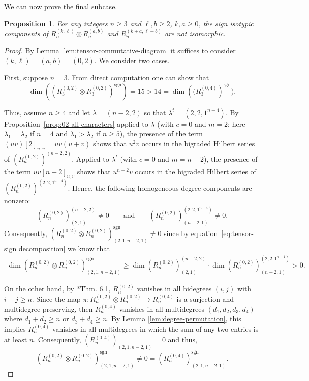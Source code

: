 \documentclass[11pt, reqno]{amsart}
\newtheorem{proposition}[theorem]{Proposition}
\theoremstyle{definition}
\theoremstyle{remark}
\numberwithin{equation}{section}
\newcommand{\0}{\emptyset}
\DeclareMathOperator{\sgn}{sgn}
\begin{document}
We can now prove the final subcase.

\begin{proposition}\label{prop:(0,2)x(0,2)}
    For any integers $n\geq 3$ and $\ell, b\geq 2$, $k,a\geq 0$, the sign isotypic components of $R_n^{(k,\ell)} \otimes R_n^{(a,b)}$ and $R_n^{(k+a, \ell+b)}$ are not isomorphic. 
\end{proposition}

\begin{proof}
By Lemma \ref{lem:tensor-commutative-diagram} it suffices to consider $(k,\ell)=(a,b)=(0,2)$. We consider two cases. 

First, suppose $n=3$. From direct computation one can show that 
\[\dim\left(\left(R_3^{(0,2)} \otimes R_3^{(0,2)}\right)^{\sgn}\right) = 15 > 14 = \dim\left((R_3^{(0,4)}\right)^{\sgn}).\]

Thus, assume $n \geq 4$ and let $\lambda = (n-2,2)$ so that $\lambda^t =(2,2,1^{n-4})$. 
By Proposition~\ref{prop:02-all-characters} 
applied to $\lambda$ (with $c = 0$ and $m = 2$; here $\lambda_1 = \lambda_2$ if $n = 4$ and $\lambda_1 > \lambda_2$ if $n \geq 5$), the presence of the term $(uv)[2]_{u,v} = uv(u+v)$ shows that $u^2v$ occurs in the bigraded Hilbert series of $(R_n^{(0,2)})^{(n-2,2)}$. 
Applied to $\lambda^t$ (with $c = 0$ and $m = n-2$), the presence of the term $uv[n-2]_{u,v}$ shows that $u^{n-2}v$ occurs in the bigraded Hilbert series of $(R_n^{(0,2)})^{(2,2,1^{n-4})}$.
Hence, the following homogeneous degree components are nonzero:
\[
\left(R_n^{(0,2)}\right)^{(n-2,2)}_{(2,1)} \neq 0 \qquad \text{and} \qquad \left(R_n^{(0,2)}\right)^{(2,2,1^{n-4})}_{(n-2,1)} \neq 0.
\]
Consequently, $\left(R_n^{(0,2)} \otimes R_n^{(0,2)}\right)^{\sgn}_{(2,1,n-2,1)} \neq 0$ since by equation~\eqref{eq:tensor-sign decomposition} we know that
\begin{align*}
        \dim \left(R_n^{(0,2)} \otimes R_n^{(0,2)}\right)^{\sgn}_{(2,1,n-2,1)} 
        \geq \dim \left(R_n^{(0,2)}\right)^{(n-2,2)}_{(2,1)} \cdot \dim \left(R_n^{(0,2)}\right)^{(2,2,1^{n-4})}_{(n-2,1)} >0.
\end{align*}

On the other hand, by \cite{KimRhoades2022}*{Thm. 6.1}, $R_n^{(0,2)}$ vanishes in all bidegrees $(i,j)$ with $i+j\geq n$. Since the map $\pi: R_n^{(0,2)} \otimes R_n^{(0,2)} \to R_n^{(0,4)}$ is a surjection and multidegree-preserving, then $R_n^{(0,4)}$ vanishes in all multidegrees $(d_1,d_2,d_3,d_4)$ where $d_1+d_2\geq n$ or $d_3+d_4 \geq n$. By Lemma \ref{lem:degree-permutation}, this implies $R_n^{(0,4)}$ vanishes in all multidegrees in which the sum of any two entries is at least $n$. Consequently, $(R_n^{(0,4)})_{(2,1,n-2,1)}=0$ and thus,
\[
\left(R_n^{(0,2)} \otimes R_n^{(0,2)}\right)^{\sgn}_{(2,1,n-2,1)}  \neq 0= \left(R_n^{(0,4)}\right)^{\sgn}_{(2,1,n-2,1)}.
\]
\end{proof}
\end{document}
